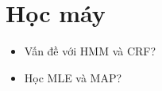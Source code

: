 \part{Học máy}

\begin{itemize}
  \item Vấn đề với HMM và CRF?
  \item Học MLE và MAP?
\end{itemize}

